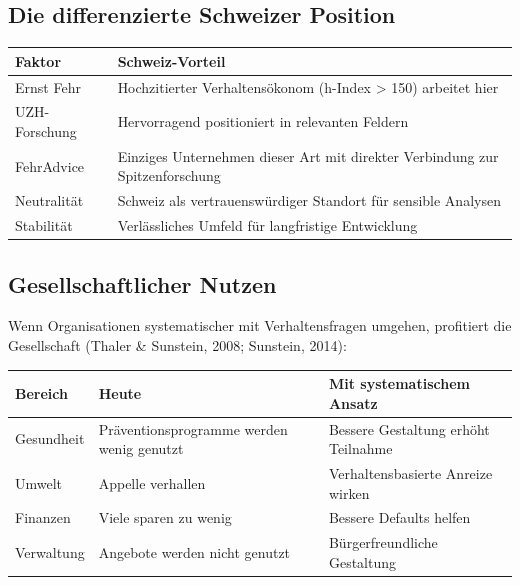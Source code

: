 \documentclass[11pt,a4paper]{article}
\begin{document}
\subsection{Die differenzierte Schweizer Position}

\begin{table}[h]
\centering
\begin{tabular}{@{}L{3cm}L{10cm}@{}}
\toprule
\textbf{Faktor} & \textbf{Schweiz-Vorteil} \\
\midrule
Ernst Fehr & Hochzitierter Verhaltensökonom (h-Index > 150) arbeitet hier \\
UZH-Forschung & Hervorragend positioniert in relevanten Feldern \\
FehrAdvice & Einziges Unternehmen dieser Art mit direkter Verbindung zur Spitzenforschung \\
Neutralität & Schweiz als vertrauenswürdiger Standort für sensible Analysen \\
Stabilität & Verlässliches Umfeld für langfristige Entwicklung \\
\bottomrule
\end{tabular}
\end{table}

\subsection{Gesellschaftlicher Nutzen}

Wenn Organisationen systematischer mit Verhaltensfragen umgehen, profitiert die Gesellschaft (Thaler \& Sunstein, 2008; Sunstein, 2014):

\begin{table}[h]
\centering
\begin{tabular}{@{}L{3cm}L{5cm}L{5cm}@{}}
\toprule
\textbf{Bereich} & \textbf{Heute} & \textbf{Mit systematischem Ansatz} \\
\midrule
Gesundheit & Präventionsprogramme werden wenig genutzt & Bessere Gestaltung erhöht Teilnahme \\
Umwelt & Appelle verhallen & Verhaltensbasierte Anreize wirken \\
Finanzen & Viele sparen zu wenig & Bessere Defaults helfen \\
Verwaltung & Angebote werden nicht genutzt & Bürgerfreundliche Gestaltung \\
\bottomrule
\end{tabular}
\end{table}
\end{document}
